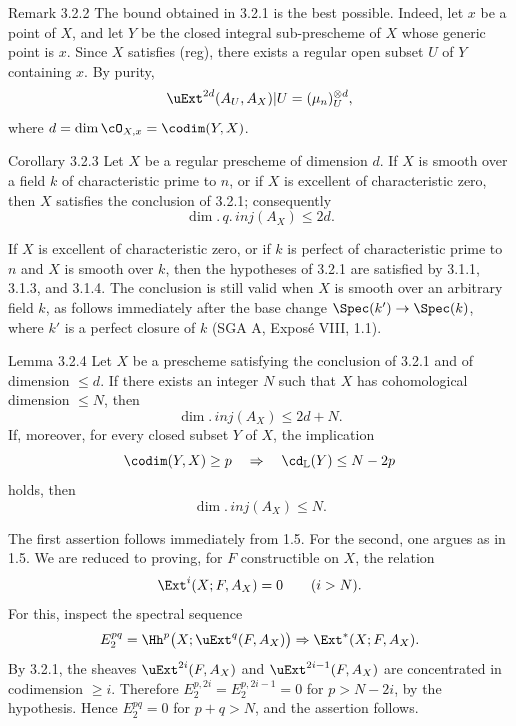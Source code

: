 \begin{statement}{Remark 3.2.2}
The bound obtained in 3.2.1 is the best possible. Indeed, let $x$ be a point of $X$, and let $Y$ be the closed integral sub-prescheme of $X$ whose generic point is $x$. Since $X$ satisfies (reg), there exists a regular open subset $U$ of $Y$ containing $x$. By purity,
\[
   \uExt^{2d}(A_U,A_X)|U=(\mu_n)^{\otimes d}_U,
\]
where $d=\dim\cO_{X,x}=\codim(Y,X)$.
\end{statement}

\begin{statement}{Corollary 3.2.3}
Let $X$ be a regular prescheme of dimension $d$. If $X$ is smooth over a field $k$ of characteristic prime to $n$, or if $X$ is excellent of characteristic zero, then $X$ satisfies the conclusion of 3.2.1; consequently
\[
   \dim.\,q.\,inj(A_X)\le 2d.
\]
\end{statement}

\begin{prooftext}
If $X$ is excellent of characteristic zero, or if $k$ is perfect of characteristic prime to $n$ and $X$ is smooth over $k$, then the hypotheses of 3.2.1 are satisfied by 3.1.1, 3.1.3, and 3.1.4. The conclusion is still valid when $X$ is smooth over an arbitrary field $k$, as follows immediately after the base change $\Spec(k')\to\Spec(k)$, where $k'$ is a perfect closure of $k$ (SGA A, Exposé VIII, 1.1). \qedtext
\end{prooftext}

\begin{statement}{Lemma 3.2.4}
Let $X$ be a prescheme satisfying the conclusion of 3.2.1 and of dimension $\le d$. If there exists an integer $N$ such that $X$ has cohomological dimension $\le N$, then
\[
   \dim.\,inj(A_X)\le 2d+N.
\]
If, moreover, for every closed subset $Y$ of $X$, the implication
\[
   \codim(Y,X)\ge p \quad\Rightarrow\quad \cd_{\mathbb{L}}(Y)\le N-2p
\]
holds, then
\[
   \dim.\,inj(A_X)\le N.
\]
\end{statement}

\begin{prooftext}
The first assertion follows immediately from 1.5. For the second, one argues as in 1.5. We are reduced to proving, for $F$ constructible on $X$, the relation
\[
   \Ext^i(X;F,A_X)=0\qquad(i>N).
\]
For this, inspect the spectral sequence
\[
   E_2^{pq}=\Hh^p\bigl(X;\uExt^q(F,A_X)\bigr)
      \Rightarrow \Ext^*(X;F,A_X).
\]
By 3.2.1, the sheaves $\uExt^{2i}(F,A_X)$ and $\uExt^{2i-1}(F,A_X)$ are concentrated in codimension $\ge i$. Therefore $E_2^{p,2i}=E_2^{p,2i-1}=0$ for $p>N-2i$, by the hypothesis. Hence $E_2^{pq}=0$ for $p+q>N$, and the assertion follows. \qedtext
\end{prooftext}

